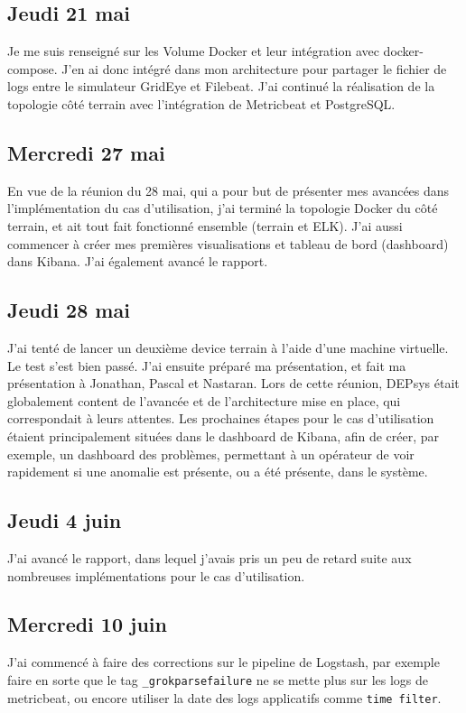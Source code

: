 \documentclass[paper=a4, fontsize=11pt]{scrartcl}
\begin{document}
\subsection{Jeudi 21 mai}
    Je me suis renseigné sur les Volume Docker et leur intégration avec docker-compose. J'en ai donc intégré dans mon architecture pour partager le fichier de logs entre le simulateur GridEye et Filebeat. J'ai continué la réalisation de la topologie côté terrain avec l'intégration de Metricbeat et PostgreSQL.
\subsection{Mercredi 27 mai}
    En vue de la réunion du 28 mai, qui a pour but de présenter mes avancées dans l'implémentation du cas d'utilisation, j'ai terminé la topologie Docker du côté terrain, et ait tout fait fonctionné ensemble (terrain et ELK). J'ai aussi commencer à créer mes premières visualisations et tableau de bord (dashboard) dans Kibana. J'ai également avancé le rapport.
\subsection{Jeudi 28 mai}
    J'ai tenté de lancer un deuxième \og device terrain \fg à l'aide d'une machine virtuelle. Le test s'est bien passé. J'ai ensuite préparé ma présentation, et fait ma présentation à Jonathan, Pascal et Nastaran. Lors de cette réunion, DEPsys était globalement content de l'avancée et de l'architecture mise en place, qui correspondait à leurs attentes. Les prochaines étapes pour le cas d'utilisation étaient principalement situées dans le dashboard de Kibana, afin de créer, par exemple, un dashboard des problèmes, permettant à un opérateur de voir rapidement si une anomalie est présente, ou a été présente, dans le système.
\subsection{Jeudi 4 juin}
    J'ai avancé le rapport, dans lequel j'avais pris un peu de retard suite aux nombreuses implémentations pour le cas d'utilisation.
\subsection{Mercredi 10 juin}
    J'ai commencé à faire des corrections sur le pipeline de Logstash, par exemple faire en sorte que le tag \verb,_grokparsefailure, ne se mette plus sur les logs de metricbeat, ou encore utiliser la date des logs applicatifs comme \verb,time filter,.
\end{document}
